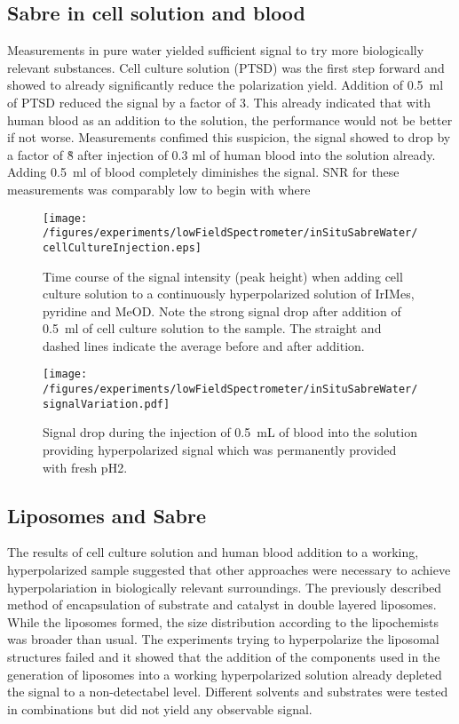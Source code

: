     \subsection{Sabre in cell solution and blood}
        Measurements in pure water yielded sufficient signal to try more biologically relevant substances. Cell culture solution (PTSD) was the first step forward and showed to already significantly reduce the polarization yield. Addition of \SI{0.5}{\milli\litre} of PTSD reduced the signal by a factor of 3. This already indicated that with human blood as an addition to the solution, the performance would not be better if not worse. Measurements confimed this suspicion, the signal showed to drop by a factor of \~8 after injection of 0.3 ml of human blood into the solution already. Adding \SI{0.5}{\milli\litre} of blood completely diminishes the signal. SNR for these measurements was comparably low to begin with where
        \begin{figure}
            \texttt{[image: /figures/experiments/lowFieldSpectrometer/inSituSabreWater/cellCultureInjection.eps]}
            \caption[Cell culture solution addition to hyperpolarized signal]{Time course of the signal intensity (peak height) when adding cell culture solution to a continuously hyperpolarized solution of IrIMes, pyridine and MeOD. Note the strong signal drop after addition of \SI{0.5}{\milli\litre} of cell culture solution to the sample. The straight and dashed lines indicate the average before and after addition.}
            \label{chap:MaterialsAndMethods:bloodInjection}
        \end{figure}
        \begin{figure}
            \texttt{[image: /figures/experiments/lowFieldSpectrometer/inSituSabreWater/signalVariation.pdf]}
            \label{chap:MaterialsAndMethods:bloodInjection2}
            \caption[Blood addition to hyperpolarized signal]{Signal drop during the injection of \SI{0.5}{\milli\liter} of blood into the solution providing hyperpolarized signal which was permanently provided with fresh pH2.}
        \end{figure}
    \subsection{Liposomes and Sabre}
        The results of cell culture solution and human blood addition to a working, hyperpolarized sample suggested that other approaches were necessary to achieve hyperpolariation in biologically relevant surroundings. The previously described method of encapsulation of substrate and catalyst in double layered liposomes. While the liposomes formed, the size distribution according to the lipochemists was broader than usual.  The experiments trying to hyperpolarize the liposomal structures failed and it showed that the addition of the components used in the generation of liposomes into a working hyperpolarized solution already depleted the signal to a non-detectabel level. Different solvents and substrates were tested in combinations but did not yield any observable signal.
